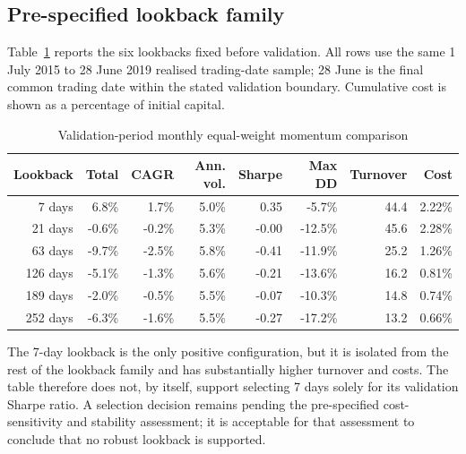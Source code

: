 \documentclass[11pt,a4paper]{article}
\begin{document}
\subsection{Pre-specified lookback family}
Table~\ref{tab:validation-lookbacks} reports the six lookbacks fixed before validation. All rows use the same 1 July 2015 to 28 June 2019 realised trading-date sample; 28 June is the final common trading date within the stated validation boundary. Cumulative cost is shown as a percentage of initial capital.

\begin{table}[htbp]
\centering
\caption{Validation-period monthly equal-weight momentum comparison}
\label{tab:validation-lookbacks}
\small
\begin{tabular}{@{}rrrrrrrr@{}}
\toprule
\rowcolor{ReportMist}
\textbf{Lookback} & \textbf{Total} & \textbf{CAGR} & \textbf{Ann. vol.} & \textbf{Sharpe} & \textbf{Max DD} & \textbf{Turnover} & \textbf{Cost} \\
\midrule
7 days & 6.8\% & 1.7\% & 5.0\% & 0.35 & -5.7\% & 44.4 & 2.22\% \\
21 days & -0.6\% & -0.2\% & 5.3\% & -0.00 & -12.5\% & 45.6 & 2.28\% \\
63 days & -9.7\% & -2.5\% & 5.8\% & -0.41 & -11.9\% & 25.2 & 1.26\% \\
126 days & -5.1\% & -1.3\% & 5.6\% & -0.21 & -13.6\% & 16.2 & 0.81\% \\
189 days & -2.0\% & -0.5\% & 5.5\% & -0.07 & -10.3\% & 14.8 & 0.74\% \\
252 days & -6.3\% & -1.6\% & 5.5\% & -0.27 & -17.2\% & 13.2 & 0.66\% \\
\bottomrule
\end{tabular}
\end{table}

The 7-day lookback is the only positive configuration, but it is isolated from the rest of the lookback family and has substantially higher turnover and costs. The table therefore does not, by itself, support selecting 7 days solely for its validation Sharpe ratio. A selection decision remains pending the pre-specified cost-sensitivity and stability assessment; it is acceptable for that assessment to conclude that no robust lookback is supported.

\FloatBarrier
\end{document}
